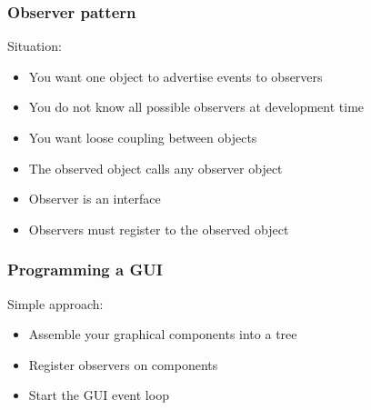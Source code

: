 \documentclass[french, english]{beamer}
\begin{document}
\begin{frame}
	\frametitle{Observer pattern}
	Situation:
	\begin{itemize}
		\item You want one object to advertise events to observers
		\item You do not know all possible observers at development time
		\item You want loose coupling between objects
	\end{itemize}
	\begin{itemize}
		\item The observed object calls any observer object
		\item Observer is an interface
		\item Observers must register to the observed object
	\end{itemize}
	\begin{center}
	\end{center}
\end{frame}

\begin{frame}
	\frametitle{Programming a GUI}
	Simple approach:
	\begin{itemize}
		\item Assemble your graphical components into a tree
		\item Register observers on components
		\item Start the GUI event loop
	\end{itemize}
\end{frame}
\end{document}
